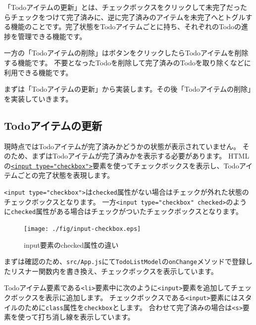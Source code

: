 「Todoアイテムの更新」とは、チェックボックスをクリックして未完了だったらチェックをつけて完了済みに、逆に完了済みのアイテムを未完了へとトグルする機能のことです。完了状態をTodoアイテムごとに持ち、それぞれのTodoの進捗を管理できる機能です。

一方の「Todoアイテムの削除」はボタンをクリックしたらTodoアイテムを削除する機能です。
不要となったTodoを削除して完了済みのTodoを取り除くなどに利用できる機能です。

まずは「Todoアイテムの更新」から実装します。その後「Todoアイテムの削除」を実装していきます。

\hypertarget{todo-item-update}{%
\subsection{Todoアイテムの更新}\label{todo-item-update}}

現時点ではTodoアイテムが完了済みかどうかの状態が表示されていません。
そのため、まずはTodoアイテムが完了済みかを表示する必要があります。
HTMLの\href{https://developer.mozilla.org/ja/docs/Web/HTML/Element/Input/checkbox}{\texttt{<input type="checkbox">}}要素を使ってチェックボックスを表示し、Todoアイテムごとの完了状態を表現します。

\texttt{<input type="checkbox">}は\texttt{checked}属性がない場合はチェックが外れた状態のチェックボックスとなります。
一方\texttt{<input type="checkbox" checked>}のように\texttt{checked}属性がある場合はチェックがついたチェックボックスとなります。

\begin{figure}[h]
\centering
\texttt{[image: ./fig/input-checkbox.eps]}
\caption{input要素のchecked属性の違い}
\end{figure}

まずは確認のため、\texttt{src/App.js}にて\texttt{TodoListModel}の\texttt{onChange}メソッドで登録したリスナー関数内を書き換え、チェックボックスを表示しています。

Todoアイテム要素である\texttt{<li>}要素中に次のように\texttt{<input>}要素を追加してチェックボックスを表示に追加します。
チェックボックスである\texttt{<input>}要素にはスタイルのために\texttt{class}属性を\texttt{checkbox}とします。
合わせて完了済みの場合は\texttt{<s>}要素を使って打ち消し線を表示しています。



